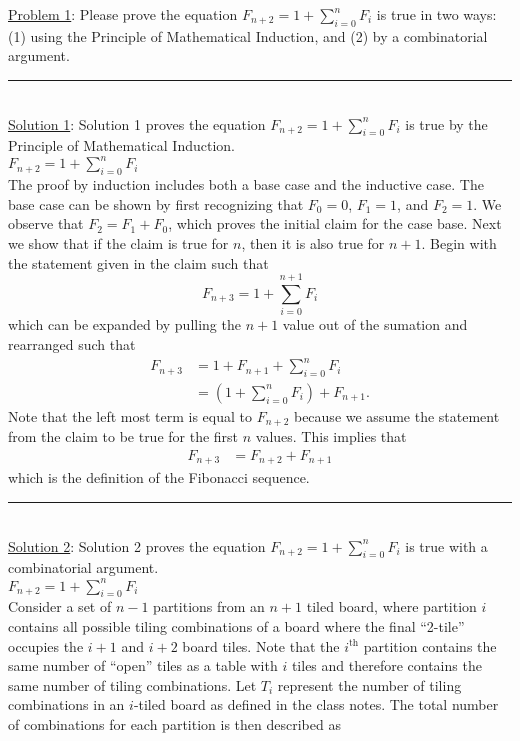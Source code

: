\documentclass{article}
\newcommand{\statementsep}{\leavevmode\\[0.005in] \rule[\baselineskip/4]{\textwidth}{0.4pt}\leavevmode\\[0.005in]}
\begin{document}
\noindent\underline{Problem 1}: Please prove the equation $F_{n+2} = 1 + \sum_{i=0}^n F_i$ is true in two ways: (1) using the Principle of Mathematical Induction, and (2) by a combinatorial argument.
\statementsep
\noindent\underline{Solution 1}: Solution 1 proves the equation $F_{n+2} = 1 + \sum_{i=0}^n F_i$ is true by the Principle of Mathematical Induction.
\\[0.05in]$F_{n+2} = 1 + \sum_{i=0}^n F_i$
\\[0.05in] The proof by induction includes both a base case and the inductive case.  The base case can be shown by first recognizing that $F_0 = 0$, $F_1 = 1$, and $F_2 = 1$. We observe that $F_2 = F_1 + F_0$, which proves the initial claim for the case base. Next we show that if the claim is true for $n$, then it is also true for $n+1$. Begin with the statement given in the claim such that
\begin{equation*}
F_{n+3} = 1 + \sum_{i=0}^{n+1} F_i
\end{equation*}
which can be expanded by pulling the $n+1$ value out of the sumation and rearranged such that
\begin{equation*}\begin{aligned}
F_{n+3} &= 1 + F_{n+1} + \sum_{i=0}^n F_i \\
	    &= \left (1 + \sum_{i=0}^n F_i \right ) + F_{n+1}.
\end{aligned}\end{equation*}
Note that the left most term is equal to $F_{n+2}$ because we assume the statement from the claim to be true for the first $n$ values. This implies that
\begin{equation*}\begin{aligned}
F_{n+3} &= F_{n+2} + F_{n+1}
\end{aligned}\end{equation*}
which is the definition of the Fibonacci sequence.
\statementsep
\noindent\underline{Solution 2}: Solution 2 proves the equation $F_{n+2} = 1 + \sum_{i=0}^n F_i$ is true with a combinatorial argument.
\\[0.05in]$F_{n+2} = 1 + \sum_{i=0}^n F_i$
\\[0.05in] Consider a set of $n - 1$ partitions from an $n+1$ tiled board, where partition $i$ contains all possible tiling combinations of a board where the final ``2-tile'' occupies the $i+1$ and $i+2$ board tiles. Note that the $i^{\text{th}}$ partition contains the same number of ``open'' tiles as a table with $i$ tiles and therefore contains the same number of tiling combinations. Let $T_i$ represent the number of tiling combinations in an $i$-tiled board as defined in the class notes. The total number of combinations for each partition is then described as 
\end{document}
